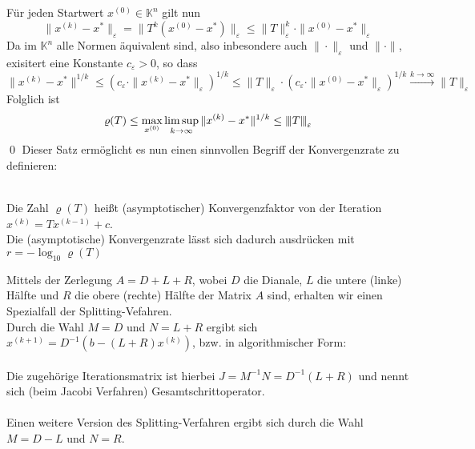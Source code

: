 \documentclass{article}
\begin{document}
Für jeden Startwert $x^{(0)}\in\mathbb{K}^n$ gilt nun 
\[\|x^{(k)}-x^*\|_\varepsilon = \|T^k(x^{(0)}-x^*)\|_\varepsilon
\leq \|T\|_\varepsilon^k\cdot \|x^{(0)}-x^*\|_\varepsilon\]
Da im $\mathbb{K}^n$ alle Normen äquivalent sind, also inbesondere auch $\|\cdot\|_\varepsilon$ 
und $\|\cdot\|$, exisitert eine Konstante $c_\varepsilon>0$, so dass
\[\|x^{(k)}-x^*\|^{1/k}\leq\left(c_\varepsilon\cdot\|x^{(k)}-x^*\|_\varepsilon\right)^{1/k}
\leq \|T\|_\varepsilon\cdot\left(c_\varepsilon\cdot\|x^{(0)}-x^*\|_\varepsilon\right)^{1/k}
\xrightarrow{k\rightarrow\infty} \|T\|_\varepsilon\]
Folglich ist 
\[\varrho(T) \le \max_{x^{(0)}} \limsup_{k\rightarrow \infty} \|x^{(k)}-x^*\|^{1/k}\le {\left\vert\kern-0.25ex\left\vert\kern-0.25ex\left\vert T \right\vert\kern-0.25ex\right\vert\kern-0.25ex\right\vert}_\varepsilon\]
\qed
Dieser Satz ermöglicht es nun einen sinnvollen Begriff der Konvergenzrate zu definieren:
\begin{defbox} \\
    Die Zahl $\varrho(T)$ heißt (asymptotischer) Konvergenzfaktor von der Iteration $x^{(k)}=Tx^{(k-1)}+c$. \\
    Die (asymptotische) Konvergenzrate lässt sich dadurch ausdrücken mit $r=-\log_{10}\varrho(T)$
\end{defbox}
Mittels der Zerlegung $A=D+L+R$, wobei $D$ die Dianale, $L$ die untere (linke) Hälfte 
und $R$ die obere (rechte) Hälfte der Matrix $A$ sind, erhalten wir einen Spezialfall der Splitting-Vefahren. \\
Durch die Wahl $M=D$ und $N=L+R$ ergibt sich $x^{(k+1)}=D^{-1}(b - (L+R)x^{(k)})$, bzw. in algorithmischer Form:\\ \\
Die zugehörige Iterationsmatrix ist hierbei $J=M^{-1}N = D^{-1}(L+R)$ 
und nennt sich (beim Jacobi Verfahren) Gesamtschrittoperator. \\ \\
Einen weitere Version des Splitting-Verfahren ergibt sich durch die Wahl $M=D-L$ und $N=R$.
\end{document}
